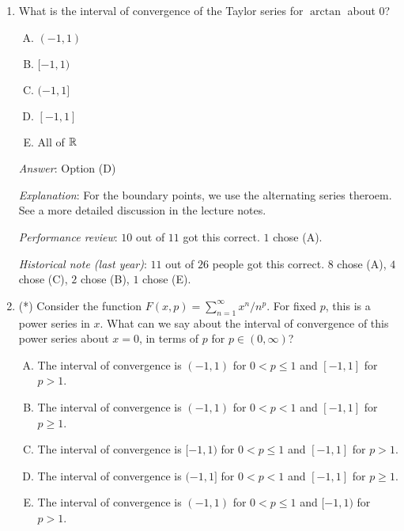\documentclass[10pt]{amsart}
\begin{document}
\begin{enumerate}
  {\em Answer}: Option (A)

  {\em Explanation}: Since the Taylor series converges to the function
  on its interval of convergence, the interval of convergence must be
  contained in the domain of definition. In particular, it must
  exclude all the $\alpha_i$s. Hence, the radius of convergence cannot
  be more than the minimum of the distances from $c$ to the
  $\alpha_i$s.

  That it is exactly equal to the minimum can be shown by using the
  fact that we get a product of geometric series.

  {\em Performance review}: $3$ out of $11$ got this correct. $4$
  chose (E), $2$ chose (C), $1$ chose (B).

  {\em Historical note (last year)}: $10$ out of $26$ people got this
  correct. $6$ people chose (C), $5$ chose (E), $2$ each chose (B) and
  (D), $1$ left the question blank.

\item What is the interval of convergence of the Taylor series for
  $\arctan$ about $0$?
  
  \begin{enumerate}[(A)]
  \item $(-1,1)$
  \item $[-1,1)$
  \item $(-1,1]$
  \item $[-1,1]$
  \item All of $\mathbb{R}$
  \end{enumerate}

  {\em Answer}: Option (D)

  {\em Explanation}: For the boundary points, we use the alternating
  series theroem. See a more detailed discussion in the lecture notes.

  {\em Performance review}: $10$ out of $11$ got this correct. $1$
  chose (A).

  {\em Historical note (last year)}: $11$ out of $26$ people got this
  correct. $8$ chose (A), $4$ chose (C), $2$ chose (B), $1$ chose (E).

\item (*) Consider the function $F(x,p) = \sum_{n=1}^\infty x^n/n^p$. For
  fixed $p$, this is a power series in $x$. What can we say about the
  interval of convergence of this power series about $x = 0$, in terms
  of $p$ for $p \in (0,\infty)$?
  \begin{enumerate}[(A)]
  \item The interval of convergence is $(-1,1)$ for $0 < p \le 1$ and
    $[-1,1]$ for $p > 1$.
  \item The interval of convergence is $(-1,1)$ for $0 < p < 1$ and
    $[-1,1]$ for $p \ge 1$.
  \item The interval of convergence is $[-1,1)$ for $0 < p \le 1$ and
    $[-1,1]$ for $p > 1$.
  \item The interval of convergence is $(-1,1]$ for $0 < p < 1$ and
    $[-1,1]$ for $p \ge 1$.
  \item The interval of convergence is $(-1,1)$ for $0 < p \le 1$ and
    $[-1,1)$ for $p > 1$.
  \end{enumerate}


\end{enumerate}
\end{document}

